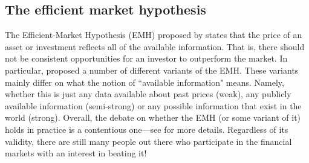\documentclass[12pt]{article}
\begin{document}
\subsection{The efficient market hypothesis}
The Efficient-Market Hypothesis (EMH) proposed by \cite{fama1970jf} states that the price of an asset or investment reflects all of the available information. That is, there should not be consistent opportunities for an investor to outperform the market. In particular, \cite{fama1970jf} proposed a number of different variants of the EMH. These variants mainly differ on what the notion of ``available information" means. Namely, whether this is just any data available about past prices (weak), any publicly available information (semi-strong) or any possible information that exist in the world (strong). Overall, the debate on whether the EMH (or some variant of it) holds in practice is a contentious one---see \cite{malkiel2003jep} for more details. Regardless of its validity, there are still many people out there who participate in the financial markets with an interest in beating it!
\end{document}
